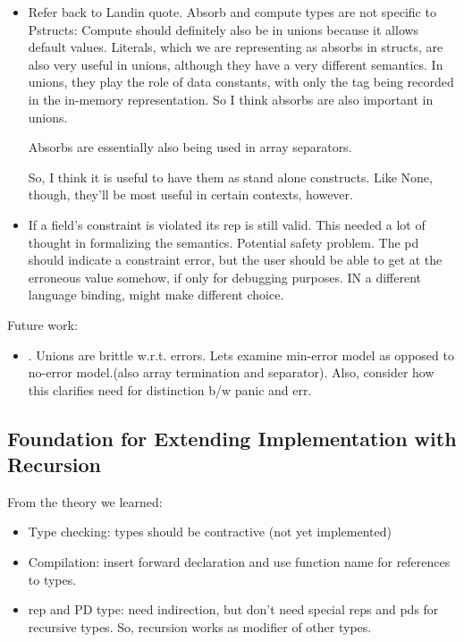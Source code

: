 \begin{itemize}     
 \item Refer back to Landin quote.  Absorb and compute types are not
   specific to Pstructs: Compute should definitely also be in unions
   because it allows default values.  Literals, which we are
   representing as absorbs in structs, are also very useful in unions,
   although they have a very different semantics.  In unions, they
   play the role of data constants, with only the tag being recorded
   in the in-memory representation.  So I think absorbs are also
   important in unions.

   Absorbs are essentially also being used in array separators.

   So, I think it is useful to have them as stand alone constructs.  Like
   None, though, they'll be most useful in certain contexts, however.

 \item If a field's constraint is violated its rep is still
   valid. This needed a lot of thought in formalizing the
   semantics. Potential safety problem.
   The pd should indicate a constraint error, but the user should be
   able to get at the erroneous value somehow, if only for debugging
   purposes.
   IN a different language binding, might make different choice.
\end{itemize}

Future work:
\begin{itemize}
 \item. Unions are brittle w.r.t. errors. Lets examine min-error model
   as opposed to no-error model.(also array termination and
   separator). Also, consider how this clarifies need for distinction
   b/w panic and err.
 \end{itemize}

\subsection{Foundation for Extending Implementation with Recursion}

From the theory we learned:
\begin{itemize}
\item Type checking: types should be contractive (not yet implemented)
\item Compilation: insert forward declaration and use function name for
  references to types.
\item rep and PD type: need indirection, but don't need special reps
  and pds for recursive types. So, recursion works as modifier of
  other types.
\end{itemize}

